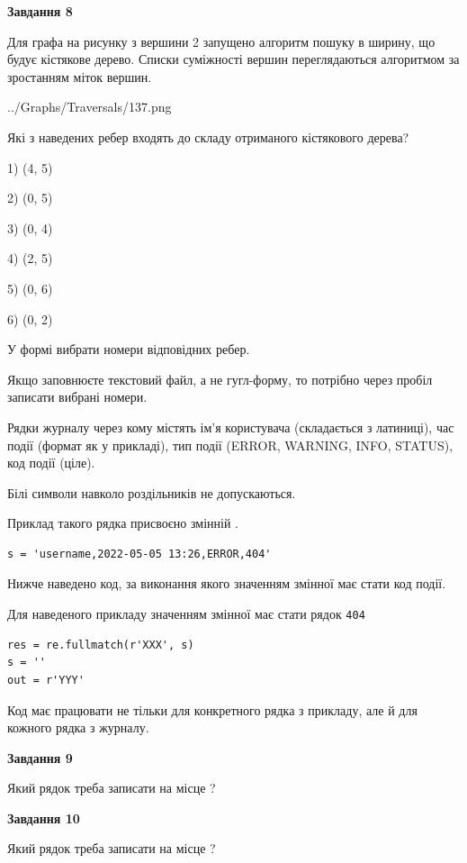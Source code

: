 \documentclass[12pt, ukrainian]{article}
\def\code#1{\Verb!#1!}
\begin{document}
{\begin {large}
{\begin {center}\textbf{Завдання 8}\end {center}}\par
Для графа на рисунку з вершини 2 запущено алгоритм пошуку в ширину, що будує кістякове дерево. Списки суміжності вершин переглядаються алгоритмом за зростанням міток вершин.\par
\begin{center}
	{../Graphs/Traversals/137.png}
\end{center}
\par Які з наведених ребер входять до складу отриманого кістякового дерева?\par
1) (4, 5)\par
2) (0, 5)\par
3) (0, 4)\par
4) (2, 5)\par
5) (0, 6)\par
6) (0, 2)\par
{\vskip 15pt} У формі вибрати номери відповідних ребер.


Якщо заповнюєте текстовий файл, а не гугл-форму, то потрібно через пробіл записа\-ти вибрані номери.\par
\newpage


Рядки журналу через кому містять ім'я користувача (складається з латиниці), час події (фор\-мат як у прикладі), тип події (ERROR, WARNING, INFO, STATUS), код події (ціле).

Білі символи навколо роздільників не допускаються.

Приклад такого рядка присвоєно змінній .



\begin{verbatim}
s = 'username,2022-05-05 13:26,ERROR,404'
\end{verbatim}


Нижче наведено код, за виконання якого значенням змінної  має стати код події.

Для наведеного прикладу значенням змінної  має стати рядок \code{404}



\begin{verbatim}
res = re.fullmatch(r'XXX', s)
s = ''
out = r'YYY'
\end{verbatim}


Код має працювати не тільки для конкретного рядка з прикладу, але й для кожного рядка з журналу.

{\begin {center}\textbf{Завдання 9}\end {center}}\par
Який рядок треба записати на місце  ?\par
\vspace{5mm}


{\begin {center}\textbf{Завдання 10}\end {center}}\par
Який рядок треба записати на місце  ?\par


\newpage


\end {large}}
\end{document}
